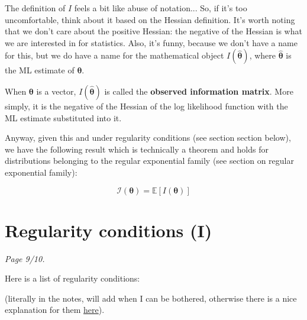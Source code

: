 The definition of \(I\) feels a bit like abuse of notation... 
So, if it's too uncomfortable, think about it based on the Hessian definition. 
It's worth noting that we don't care about the positive Hessian: the negative of the Hessian is what we are interested in for statistics. 
Also, it's funny, because we don't have a name for this, but we do have a name for the mathematical object \(I(\hat{\bm{\theta}})\), where \(\hat{\bm{\theta}}\) is the ML estimate of \(\bm{\theta}\).

\begin{definition}\label{defn:observed information matrix - multi}
    When \(\bm{\theta}\) is a vector, \(I(\hat{\bm{\theta}})\) is called the \textbf{observed information matrix}. 
    More simply, it is the negative of the Hessian of the log likelihood function with the ML estimate substituted into it. 
\end{definition}

Anyway, given this and under regularity conditions (see section section below), we have the following result which is technically a theorem and holds for distributions belonging to the regular exponential family (see section on regular exponential family):

\begin{equation}\label{eq:thm about expected info as the expectation of I}
    \mathscr{I}(\bm{\theta}) = \mathbb{E}[I(\bm{\theta})]
\end{equation}



\section{Regularity conditions (I)}\label{sec:reg conds I}

\textit{Page 9/10.}

\bigskip

Here is a list of regularity conditions:

(literally in the notes, will add when I can be bothered, otherwise there is a nice explanation for them \href{https://stats.stackexchange.com/questions/101520/what-are-the-regularity-conditions-for-likelihood-ratio-test}{here}).


